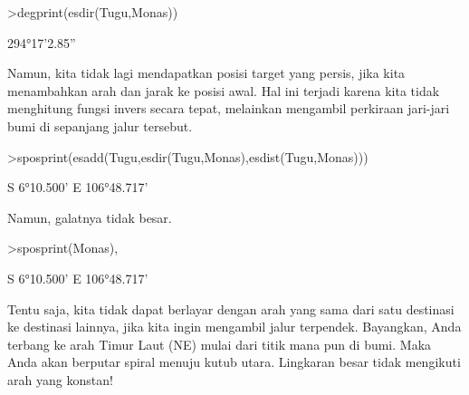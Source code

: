 \documentclass{article}
\newenvironment{eulernotebook}{\par}{\par}
\newenvironment{eulercomment}{\par\medskip}{\par\medskip}
\begin{document}
\begin{eulernotebook}
\begin{eulercomment}
\begin{eulercomment}
\begin{eulercomment}
\begin{eulercomment}
\begin{eulerprompt}
>degprint(esdir(Tugu,Monas))
\end{eulerprompt}
\begin{euleroutput}
  294°17'2.85''
\end{euleroutput}
\begin{eulercomment}
Namun, kita tidak lagi mendapatkan posisi target yang persis, jika
kita menambahkan arah dan jarak ke posisi awal. Hal ini terjadi karena
kita tidak menghitung fungsi invers secara tepat, melainkan mengambil
perkiraan jari-jari bumi di sepanjang jalur tersebut.
\end{eulercomment}
\begin{eulerprompt}
>sposprint(esadd(Tugu,esdir(Tugu,Monas),esdist(Tugu,Monas)))
\end{eulerprompt}
\begin{euleroutput}
  S 6°10.500' E 106°48.717'
\end{euleroutput}
\begin{eulercomment}
Namun, galatnya tidak besar.
\end{eulercomment}
\begin{eulerprompt}
>sposprint(Monas),
\end{eulerprompt}
\begin{euleroutput}
  S 6°10.500' E 106°48.717'
\end{euleroutput}
\begin{eulercomment}
Tentu saja, kita tidak dapat berlayar dengan arah yang sama dari satu
destinasi ke destinasi lainnya, jika kita ingin mengambil jalur
terpendek. Bayangkan, Anda terbang ke arah Timur Laut (NE) mulai dari
titik mana pun di bumi. Maka Anda akan berputar spiral menuju kutub
utara. Lingkaran besar tidak mengikuti arah yang konstan!


\end{eulercomment}
\end{eulercomment}
\end{eulercomment}
\end{eulercomment}
\end{eulercomment}
\end{eulernotebook}
\end{document}
